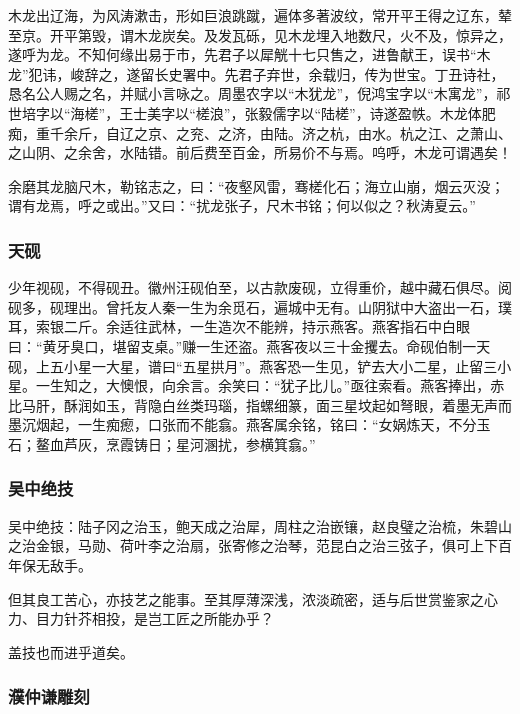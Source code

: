 \documentclass[]{article}
\begin{document}
木龙出辽海，为风涛漱击，形如巨浪跳蹴，遍体多著波纹，常开平王得之辽东，辇至京。开平第毁，谓木龙炭矣。及发瓦砾，见木龙埋入地数尺，火不及，惊异之，遂呼为龙。不知何缘出易于市，先君子以犀觥十七只售之，进鲁献王，误书``木龙''犯讳，峻辞之，遂留长史署中。先君子弃世，余载归，传为世宝。丁丑诗社，恳名公人赐之名，并赋小言咏之。周墨农字以``木犹龙''，倪鸿宝字以``木寓龙''，祁世培字以``海槎''，王士美字以``槎浪''，张毅儒字以``陆槎''，诗遂盈帙。木龙体肥痴，重千余斤，自辽之京、之兖、之济，由陆。济之杭，由水。杭之江、之萧山、之山阴、之余舍，水陆错。前后费至百金，所易价不与焉。呜呼，木龙可谓遇矣！

余磨其龙脑尺木，勒铭志之，曰：``夜壑风雷，骞槎化石；海立山崩，烟云灭没；谓有龙焉，呼之或出。''又曰：``扰龙张子，尺木书铭；何以似之？秋涛夏云。''

\hypertarget{header-n81}{%
\subsubsection{天砚}\label{header-n81}}

少年视砚，不得砚丑。徽州汪砚伯至，以古款废砚，立得重价，越中藏石俱尽。阅砚多，砚理出。曾托友人秦一生为余觅石，遍城中无有。山阴狱中大盗出一石，璞耳，索银二斤。余适往武林，一生造次不能辨，持示燕客。燕客指石中白眼曰：``黄牙臭口，堪留支桌。''赚一生还盗。燕客夜以三十金攫去。命砚伯制一天砚，上五小星一大星，谱曰``五星拱月''。燕客恐一生见，铲去大小二星，止留三小星。一生知之，大懊恨，向余言。余笑曰：``犹子比儿。''亟往索看。燕客捧出，赤比马肝，酥润如玉，背隐白丝类玛瑙，指螺细篆，面三星坟起如弩眼，着墨无声而墨沉烟起，一生痴瘛，口张而不能翕。燕客属余铭，铭曰：``女娲炼天，不分玉石；鳌血芦灰，烹霞铸日；星河溷扰，参横箕翕。''

\hypertarget{header-n86}{%
\subsubsection{吴中绝技}\label{header-n86}}

吴中绝技：陆子冈之治玉，鲍天成之治犀，周柱之治嵌镶，赵良璧之治梳，朱碧山之治金银，马勋、荷叶李之治扇，张寄修之治琴，范昆白之治三弦子，俱可上下百年保无敌手。

但其良工苦心，亦技艺之能事。至其厚薄深浅，浓淡疏密，适与后世赏鉴家之心力、目力针芥相投，是岂工匠之所能办乎？

盖技也而进乎道矣。

\hypertarget{header-n93}{%
\subsubsection{濮仲谦雕刻}\label{header-n93}}
\end{document}
